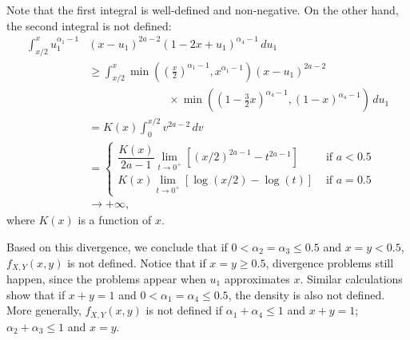 \documentclass[a4paper, notitlepage, 10pt]{article}
\theoremstyle{definition}
\begin{document}
Note that the first integral is well-defined and non-negative. On the other hand, the second integral is not defined: 
\begin{equation*}
  \begin{split}
    \int_{x/2}^{x} u_1^{\alpha_1-1}&{(x-u_1)}^{2a-2}{(1-2x+u_1)}^{\alpha_4-1} \, du_1 \\
    &\ge \int_{x/2}^x \min\left({\left(\frac{x}{2}\right)}^{\alpha_1-1}, x^{\alpha_1-1}\right){(x-u_1)}^{2a-2} \\ 
    &\hspace{3cm} \times \min\left({\left(1-\frac{3}{2}x\right)}^{\alpha_4-1}, {(1-x)}^{\alpha_4-1}\right) \, du_1 \\
    &= K(x) \int_{0}^{x/2} v^{2a-2} \, dv \\ 
    &= \begin{cases}
      \dfrac{K(x)}{2a-1} \lim_{t \to 0^+} \left[{(x/2)}^{2a-1} - t^{2a-1}\right] &\text{ if } a < 0.5 \\ 
      K(x) \lim_{t \to 0^+} \left[\log(x/2) - \log(t)\right] &\text{ if } a = 0.5
    \end{cases} \\
    &\to +\infty, 
  \end{split}
\end{equation*}
where $K(x)$ is a function of $x$. 

Based on this divergence, we conclude that if $0 < \alpha_2 = \alpha_3 \le 0.5$ and $x = y < 0.5$, $f_{X, Y}(x,y)$ is not defined. 
Notice that if $x = y \ge 0.5$, divergence problems still happen, since the problems appear when $u_1$ approximates $x$. Similar calculations show that if $x + y = 1$ and $0 < \alpha_1 = \alpha_4 \le 0.5$, the density is also not defined.
More generally, $f_{X,Y}(x,y)$ is not defined if $\alpha_1 +
\alpha_4 \le 1$ and $x + y = 1$; $\alpha_2 + \alpha_3 \le 1$ and $x = y$.
\end{document}
